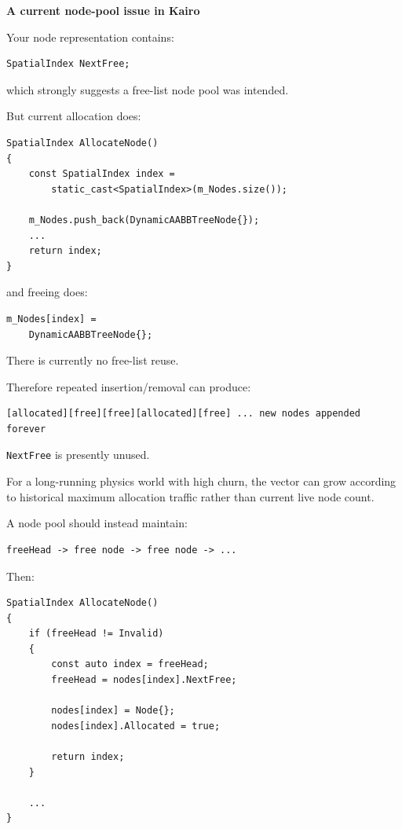 \textbf{A current node-pool issue in Kairo}

Your node representation contains:

\begin{verbatim}
SpatialIndex NextFree;
\end{verbatim}

which strongly suggests a free-list node pool was intended.

But current allocation does:

\begin{verbatim}
SpatialIndex AllocateNode()
{
    const SpatialIndex index =
        static_cast<SpatialIndex>(m_Nodes.size());

    m_Nodes.push_back(DynamicAABBTreeNode{});
    ...
    return index;
}
\end{verbatim}

and freeing does:

\begin{verbatim}
m_Nodes[index] =
    DynamicAABBTreeNode{};
\end{verbatim}

There is currently no free-list reuse.

Therefore repeated insertion/removal can produce:

\begin{verbatim}
[allocated][free][free][allocated][free] ... new nodes appended forever
\end{verbatim}

\texttt{NextFree} is presently unused.

For a long-running physics world with high churn, the vector can grow according to historical maximum allocation traffic rather than current live node count.

A node pool should instead maintain:

\begin{verbatim}
freeHead -> free node -> free node -> ...
\end{verbatim}

Then:

\begin{verbatim}
SpatialIndex AllocateNode()
{
    if (freeHead != Invalid)
    {
        const auto index = freeHead;
        freeHead = nodes[index].NextFree;

        nodes[index] = Node{};
        nodes[index].Allocated = true;

        return index;
    }

    ...
}
\end{verbatim}

